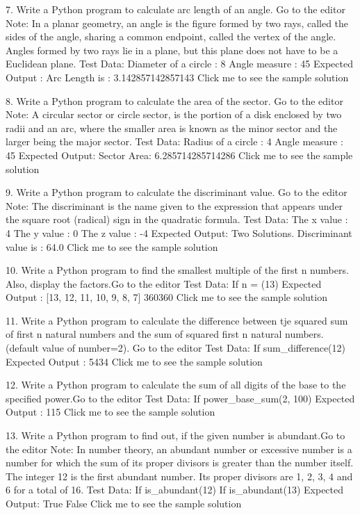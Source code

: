7. Write a Python program to calculate arc length of an angle. Go to the editor
Note: In a planar geometry, an angle is the figure formed by two rays, called the sides of the angle, sharing a common endpoint, called the vertex of the angle. Angles formed by two rays lie in a plane, but this plane does not have to be a Euclidean plane.
Test Data:
Diameter of a circle : 8
Angle measure : 45
Expected Output :
Arc Length is : 3.142857142857143
Click me to see the sample solution

8. Write a Python program to calculate the area of the sector. Go to the editor
Note: A circular sector or circle sector, is the portion of a disk enclosed by two radii and an arc, where the smaller area is known as the minor sector and the larger being the major sector.
Test Data:
Radius of a circle : 4
Angle measure : 45
Expected Output:
Sector Area: 6.285714285714286
Click me to see the sample solution

9. Write a Python program to calculate the discriminant value. Go to the editor
Note: The discriminant is the name given to the expression that appears under the square root (radical) sign in the quadratic formula. 
Test Data:
The x value : 4
The y value : 0
The z value : -4
Expected Output:
Two Solutions. Discriminant value is : 64.0
Click me to see the sample solution

10. Write a Python program to find the smallest multiple of the first n numbers. Also, display the factors.Go to the editor
Test Data:
If n = (13)
Expected Output :
[13, 12, 11, 10, 9, 8, 7]
360360 
Click me to see the sample solution

11. Write a Python program to calculate the difference between tje squared sum of first n natural numbers and the sum of squared first n natural numbers.(default value of number=2). Go to the editor
Test Data:
If sum_difference(12)
Expected Output :
5434 
Click me to see the sample solution

12. Write a Python program to calculate the sum of all digits of the base to the specified power.Go to the editor
Test Data:
If power_base_sum(2, 100)
Expected Output :
115
Click me to see the sample solution

13. Write a Python program to find out, if the given number is abundant.Go to the editor
Note: In number theory, an abundant number or excessive number is a number for which the sum of its proper divisors is greater than the number itself. The integer 12 is the first abundant number. Its proper divisors are 1, 2, 3, 4 and 6 for a total of 16.
Test Data:
If is_abundant(12)
If is_abundant(13)
Expected Output:
True
False
Click me to see the sample solution

